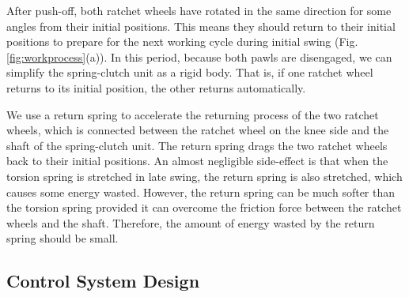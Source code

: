 \documentclass[10pt]{asme2ej}
\begin{document}
After push-off, both ratchet wheels have rotated in the same direction for some angles from their initial positions.
This means they should return to their initial positions to prepare for the next working cycle during initial swing (Fig. \ref{fig:workprocess}(a)).
In this period, because both pawls are disengaged, we can simplify the spring-clutch unit as a rigid body.
That is, if one ratchet wheel returns to its initial position, the other returns automatically.

We use a return spring to accelerate the returning process of the two ratchet wheels, which is connected between the ratchet wheel on the knee side and the shaft of the spring-clutch unit.
The return spring drags the two ratchet wheels back to their initial positions.
An almost negligible side-effect is that when the torsion spring is stretched in late swing, the return spring is also stretched, which causes some energy wasted.
However, the return spring can be much softer than the torsion spring provided it can overcome the friction force between the ratchet wheels and the shaft.
Therefore, the amount of energy wasted by the return spring should be small. 


\subsection{Control System Design}
\end{document}
